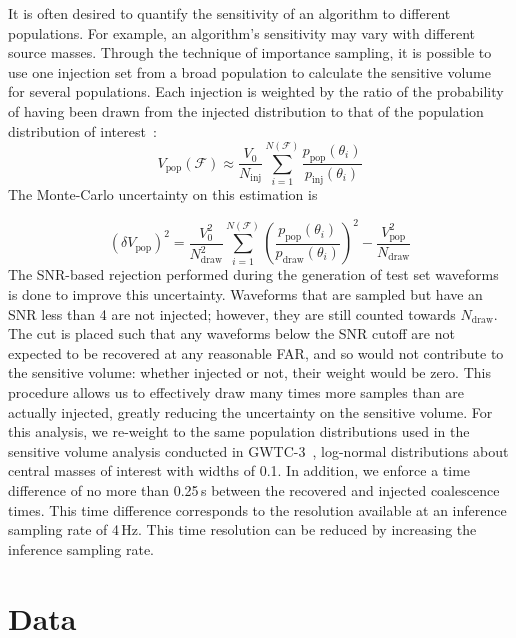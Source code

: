 \begin{refsection}
It is often desired to quantify the sensitivity of an algorithm to different populations. 
For example, an algorithm's sensitivity may vary with different source masses. 
Through the technique of importance sampling, it is possible to use one injection set from a broad population to calculate the sensitive volume for several populations. 
Each injection is weighted by the ratio of the probability of having been drawn from the injected distribution to that of the population distribution of interest~\cite{Tiwari_2018}:
\begin{equation}
    V_{\text{pop}}(\mathcal{F}) \approx \frac{V_0}{N_{\text{inj}}} \sum_{i=1}^{N(\mathcal{F})} \frac{p_{\text{pop}}(\theta_i)}{p_{\text{inj}}(\theta_i)}
\end{equation}
The Monte-Carlo uncertainty on this estimation is~\cite{Farr_2019}

\begin{equation}
    (\delta V_{\text{pop}})^2 = \frac{V_0^2}{N_{\text{draw}}^2} \sum_{i=1}^{N(\mathcal{F})} \left(\frac{p_{\text{pop}}(\theta_i)}{p_{\text{draw}}(\theta_i)} \right)^2 - \frac{V_{\text{pop}}^2}{N_{\text{draw}}}
\end{equation}
The SNR-based rejection performed during the generation of test set waveforms is done to improve this uncertainty.
Waveforms that are sampled but have an SNR less than 4 are not injected; however, they are still counted towards $N_{\text{draw}}$.
The cut is placed such that any waveforms below the SNR cutoff are not expected to be recovered at any reasonable FAR, and so would not contribute to the sensitive volume: whether injected or not, their weight would be zero.
This procedure allows us to effectively draw many times more samples than are actually injected, greatly reducing the uncertainty on the sensitive volume.
For this analysis, we re-weight to the same population distributions used in the sensitive volume analysis conducted in GWTC-3~\cite{Abbott_2023}, log-normal distributions about central masses of interest with widths of 0.1. 
In addition, we enforce a time difference of no more than 0.25\,s between the recovered and injected coalescence times. 
This time difference corresponds to the resolution available at an inference sampling rate of 4\,Hz. This time resolution can be reduced by increasing the inference sampling rate.

\section{Data} \label{aframe_meth_sec:data}

\end{refsection}
